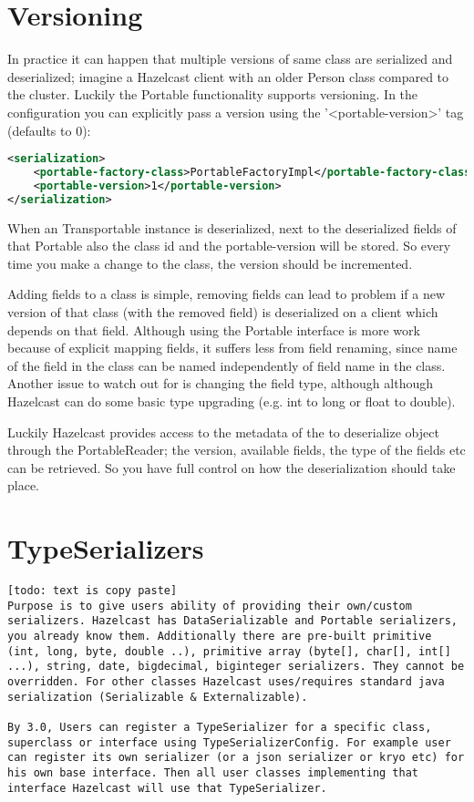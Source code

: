 \section{Versioning}
In practice it can happen that multiple versions of same class are serialized and deserialized; imagine a Hazelcast client with an older Person class compared to the cluster. Luckily the Portable functionality supports versioning. In the configuration you can explicitly pass a version using the '<portable-version>' tag (defaults to 0):
\begin{lstlisting}[language=xml]
<serialization>
    <portable-factory-class>PortableFactoryImpl</portable-factory-class>
    <portable-version>1</portable-version>
</serialization>
\end{lstlisting}
When an Transportable instance is deserialized, next to the deserialized fields of that Portable also the class id and the portable-version will be stored. So every time you make a change to the class, the version should be incremented. 

Adding fields to a class is simple, removing fields can lead to problem if a new version of that class (with the removed field) is deserialized on a client which depends on that field. Although using the Portable interface is more work because of explicit mapping fields, it suffers less from field renaming, since name of the field in the class can be named independently of field name in the class. Another issue to watch out for is changing the field type, although although Hazelcast can do some basic type upgrading (e.g. int to long or float to double). 

Luckily Hazelcast provides access to the metadata of the to deserialize object through the PortableReader; the  version, available fields, the type of the fields etc can be retrieved. So you have full control on how the deserialization should take place. 

\section{TypeSerializers}

\begin{lstlisting}
[todo: text is copy paste]
Purpose is to give users ability of providing their own/custom serializers. Hazelcast has DataSerializable and Portable serializers, you already know them. Additionally there are pre-built primitive (int, long, byte, double ..), primitive array (byte[], char[], int[] ...), string, date, bigdecimal, biginteger serializers. They cannot be overridden. For other classes Hazelcast uses/requires standard java serialization (Serializable & Externalizable). 

By 3.0, Users can register a TypeSerializer for a specific class, superclass or interface using TypeSerializerConfig. For example user can register its own serializer (or a json serializer or kryo etc) for his own base interface. Then all user classes implementing that interface Hazelcast will use that TypeSerializer.
\end{lstlisting}

